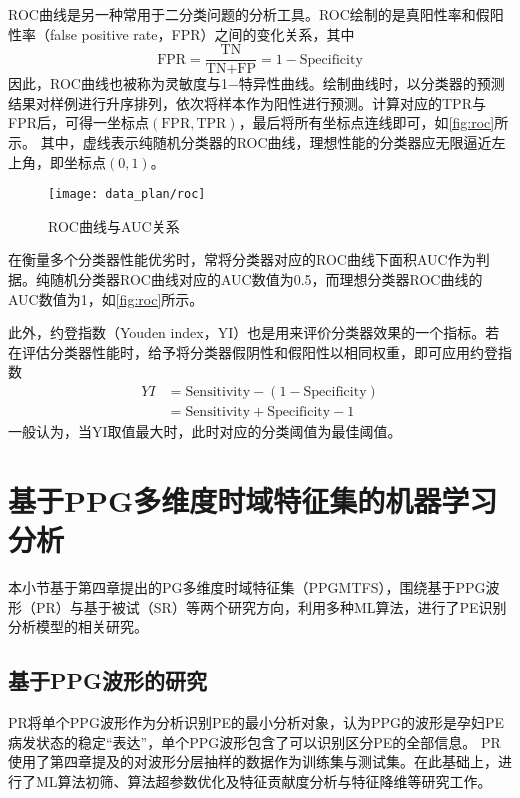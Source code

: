 ROC曲线是另一种常用于二分类问题的分析工具。ROC绘制的是真阳性率和假阳性率（false positive rate，FPR）之间的变化关系，其中
\begin{equation}
      \label{equ:fpr}
      \text{FPR}=\frac{\text{TN}}{\text{TN+FP}}=1-\text{Specificity}
\end{equation}
因此，ROC曲线也被称为灵敏度与1$-$特异性曲线。绘制曲线时，以分类器的预测结果对样例进行升序排列，依次将样本作为阳性进行预测。计算对应的TPR与FPR后，可得一坐标点$(\text{FPR},\text{TPR})$，最后将所有坐标点连线即可，如\autoref{fig:roc}所示。
其中，虚线表示纯随机分类器的ROC曲线，理想性能的分类器应无限逼近左上角，即坐标点$(0,1)$。
\begin{figure}[htbp]
      \centering
      \texttt{[image: data\_plan/roc]}
      \caption[ROC曲线与AUC关系]{\label{fig:roc}ROC曲线与AUC关系}
\end{figure}

在衡量多个分类器性能优劣时，常将分类器对应的ROC曲线下面积AUC作为判据。纯随机分类器ROC曲线对应的AUC数值为0.5，而理想分类器ROC曲线的AUC数值为1，如\autoref{fig:roc}所示。

此外，约登指数（Youden index，YI）也是用来评价分类器效果的一个指标。若在评估分类器性能时，给予将分类器假阴性和假阳性以相同权重，即可应用约登指数
\begin{equation}
      \label{equ:yi}
      \begin{aligned}
            YI&=\text{Sensitivity}-(1-\text{Specificity})\\
            &=\text{Sensitivity}+\text{Specificity}-1
      \end{aligned}
\end{equation}
一般认为，当YI取值最大时，此时对应的分类阈值为最佳阈值\cite{cwl}。

\section{基于PPG多维度时域特征集的机器学习分析}
本小节基于第四章提出的PG多维度时域特征集（PPGMTFS），围绕基于PPG波形（PR）与基于被试（SR）等两个研究方向，利用多种ML算法，进行了PE识别分析模型的相关研究。
\subsection{基于PPG波形的研究}
PR将单个PPG波形作为分析识别PE的最小分析对象，认为PPG的波形是孕妇PE病发状态的稳定“表达”，单个PPG波形包含了可以识别区分PE的全部信息。
PR使用了第四章提及的对波形分层抽样的数据作为训练集与测试集。在此基础上，进行了ML算法初筛、算法超参数优化及特征贡献度分析与特征降维等研究工作。

